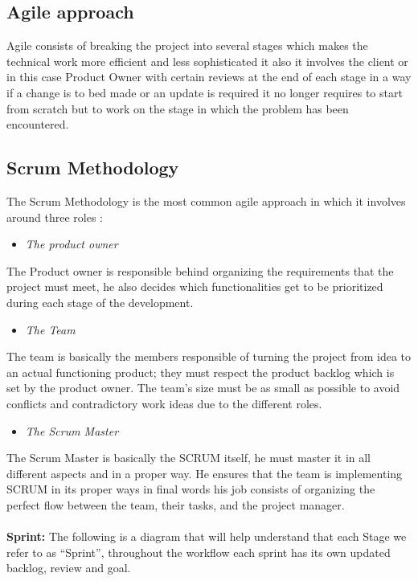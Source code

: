 \documentclass[]{report}
\begin{document}
\subsection{Agile approach}

Agile consists of breaking the project into several stages which makes the
technical work more efficient and less sophisticated it also it involves the client
or in this case Product Owner with certain reviews at the end of each stage in a
way if a change is to bed made or an update is required it no longer requires to
start from scratch but to work on the stage in which the problem has been
encountered.

\subsection{Scrum Methodology}
The Scrum Methodology is the most common agile approach in which it
involves around three roles :
\begin{itemize}
	\item \large{\emph{The product owner}}
\end{itemize}
The Product owner is responsible behind organizing the requirements that the
project must meet, he also decides which functionalities get to be prioritized
during each stage of the development.

\begin{itemize}
	\item \large{\emph{The Team}}
\end{itemize}

The team is basically the members responsible of turning the project from idea
to an actual functioning product; they must respect the product backlog which is
set by the product owner. The team’s size must be as small as possible to avoid
conflicts and contradictory work ideas due to the different roles.

\begin{itemize}
	\item \large{\emph{The Scrum Master}}
\end{itemize}

The Scrum Master is basically the SCRUM itself, he must master it in all
different aspects and in a proper way. He ensures that the team is implementing
SCRUM in its proper ways in final words his job consists of organizing the
perfect flow between the team, their tasks, and the project manager.\\ \\
\textbf{Sprint:} The following is a diagram that will help understand that each Stage we
refer to as “Sprint”, throughout the workflow each sprint has its own updated
backlog, review and goal.
\end{document}
